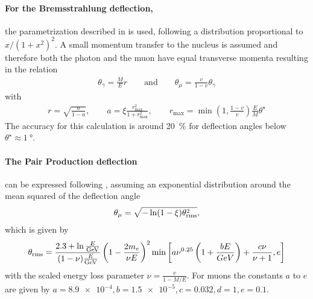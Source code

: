 \paragraph{For the Bremsstrahlung deflection,} the parametrization described in \cite{GEANT4} is used, following a distribution proportional to $x/(1 + x^2)^2$.
A small momentum transfer to the nucleus is assumed and therefore both the photon and the muon have equal transverse momenta resulting in the relation
\begin{align}
    \theta_\gamma = \frac{M}{E} r
    \qquad \text{and} \qquad
    \theta_\mu = \frac{v}{1 - v} \theta_\gamma
\end{align}
with
\begin{align*}
    r = \sqrt{\frac{a}{1 - a}} ,
    \qquad
    a = \xi \frac{r_{\max}^2}{1 + r_{\max}^2} ,
    \qquad
    r_{\max} = \min \left( 1, \frac{1-v}{v} \right) \frac{E}{M} \theta^\star
\end{align*}
The accuracy for this calculation is around \SI{20}{\%} for deflection angles below $\theta^\star \approx \SI{1}{\degree}$.

\paragraph{The Pair Production deflection} can be expressed following \cite{VanGinneken86}, assuming an exponential distribution around the mean squared of the deflection angle
\begin{align}
    \theta_\mu = \sqrt{ - \logn (1 - \xi) \theta_{\text{rms}}^2} ,
\end{align}
which is given by
\begin{align}
    \theta_{\text{rms}} = \frac{2.3 + \logn \frac{E}{\si{GeV}}}{(1 - \nu) \frac{E}{\si{GeV}}} \left(1 - \frac{2 m_e}{\nu E} \right)^2
        \min \left[ a \nu^{0.25} \left(1 + \frac{b E}{GeV} \right) + \frac{c \nu}{\nu + 1}, e \right]
\end{align}
with the scaled energy loss parameter $\nu = \frac{v}{1 - M/E}$.
For muons the constants $a$ to $e$ are given by $a=\num{8.9e-4}, b=\num{1.5e-5}, c=0.032, d=1, e=0.1$.

